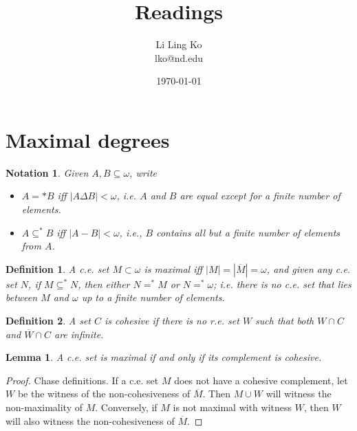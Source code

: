 \documentclass{article}
\newtheorem{notation}{Notation}[subsection]
\newtheorem{definition}{Definition}[subsection]
\newtheorem{lemma}{Lemma}[subsection]
\begin{document}
\title{Readings}
\author{Li Ling Ko\\ lko@nd.edu}
\date{\today}
\maketitle

\section{Maximal degrees}
  \begin{notation}
    Given $A,B\subseteq\omega$, write
    \begin{itemize}
      \item $A=*B$ iff $|A\Delta B|<\omega$, i.e. $A$ and $B$ are equal
        except for a finite number of elements.
      \item $A\subseteq^*B$ iff $|A-B|<\omega$, i.e., $B$ contains all but
        a finite number of elements from $A$.
    \end{itemize}
  \end{notation}

  \begin{definition}
    A c.e. set $M\subset\omega$ is \textit{maximal} iff
    $|M|=|\overline{M}|=\omega$, and given any c.e. set $N$, if
    $M\subseteq^* N$, then either $N=^*M$ or $N=^*\omega$; i.e. there is no
    c.e. set that lies between $M$ and $\omega$ up to a finite number of
    elements.
  \end{definition}

  \begin{definition}
    A set $C$ is \textit{cohesive} if there is no r.e. set $W$ such that
    both $W\cap C$ and $\overline{W}\cap C$ are infinite.
  \end{definition}

  \begin{lemma}
    A c.e. set is maximal if and only if its complement is cohesive.
    \label{lemma:maximal-cohesive}
  \end{lemma}
  \begin{proof}
    Chase definitions. If a c.e. set $M$ does not have a cohesive
    complement, let $W$ be the witness of the non-cohesiveness of
    $\overline{M}$. Then $M\cup W$ will witness the non-maximality of $M$.
    Conversely, if $M$ is not maximal with witness $W$, then $W$ will also
    witness the non-cohesiveness of $\overline{M}$.
  \end{proof}

\end{document}
